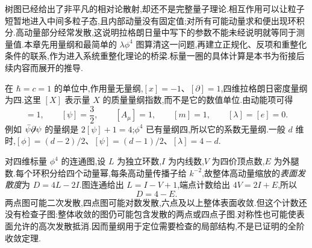 \label{ch:renormalization-entry}

树图已经给出了非平凡的相对论散射,却还不是完整量子理论.相互作用可以让粒子短暂地进入中间多粒子态,且内部动量没有固定值;对所有可能动量求和便出现环积分.高动量部分经常发散,这说明拉格朗日量中写下的参数不能未经说明就等同于测量值.本章先用量纲和最简单的 $\lambda\phi^4$ 图算清这一问题,再建立正规化、反项和重整化条件的联系,作为进入系统重整化理论的桥梁.标量一圈的具体计算是本书为衔接后续内容而展开的推导.


在 $\hbar=c=1$ 的单位中,作用量无量纲,$[x]=-1$、$[\partial]=1$,四维拉格朗日密度量纲为四.这里 $[X]$ 表示量 $X$ 的质量量纲指数,而不是它的数值单位.由动能项可得
\begin{equation}
 [\phi]=1,\qquad[\psi]=\frac32,\qquad[A_\mu]=1,
 \qquad[m]=1,\qquad[\lambda]=[e]=0.
\end{equation}
例如 $\bar\psi\slashed\partial\psi$ 的量纲是 $2[\psi]+1=4$;$\phi^4$ 已有量纲四,所以它的系数无量纲.一般 $d$ 维时,$[\phi]=(d-2)/2$、$[\psi]=(d-1)/2$、$[\lambda]=4-d$.

对四维标量 $\phi^4$ 的连通图,设 $L$ 为独立环数,$I$ 为内线数,$V$ 为四价顶点数,$E$ 为外腿数.每个环积分给四个动量幂,每条高动量传播子给 $k^{-2}$,故整体高动量缩放的\emph{表面发散度}为 $D=4L-2I$.图连通给出 $L=I-V+1$,端点计数给出 $4V=2I+E$,所以
\begin{equation}
 D=4-E.
 \label{eq:phi4-power-count}
\end{equation}
两点图可能二次发散,四点图可能对数发散,六点及以上整体表面收敛.但这个计数还没有检查子图:整体收敛的图仍可能包含发散的两点或四点子图.对称性也可能使表面允许的高次发散抵消.因而量纲用于定位需要检查的局部结构,不是已证明的全阶收敛定理.


